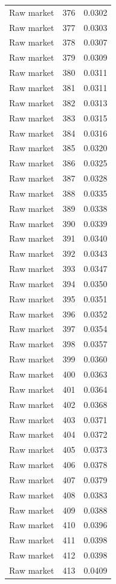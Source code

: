 \begin{table}[htbp]
\begin{tabular}{lll}
Raw market & 376 & 0.0302 \\
Raw market & 377 & 0.0303 \\
Raw market & 378 & 0.0307 \\
Raw market & 379 & 0.0309 \\
Raw market & 380 & 0.0311 \\
Raw market & 381 & 0.0311 \\
Raw market & 382 & 0.0313 \\
Raw market & 383 & 0.0315 \\
Raw market & 384 & 0.0316 \\
Raw market & 385 & 0.0320 \\
Raw market & 386 & 0.0325 \\
Raw market & 387 & 0.0328 \\
Raw market & 388 & 0.0335 \\
Raw market & 389 & 0.0338 \\
Raw market & 390 & 0.0339 \\
Raw market & 391 & 0.0340 \\
Raw market & 392 & 0.0343 \\
Raw market & 393 & 0.0347 \\
Raw market & 394 & 0.0350 \\
Raw market & 395 & 0.0351 \\
Raw market & 396 & 0.0352 \\
Raw market & 397 & 0.0354 \\
Raw market & 398 & 0.0357 \\
Raw market & 399 & 0.0360 \\
Raw market & 400 & 0.0363 \\
Raw market & 401 & 0.0364 \\
Raw market & 402 & 0.0368 \\
Raw market & 403 & 0.0371 \\
Raw market & 404 & 0.0372 \\
Raw market & 405 & 0.0373 \\
Raw market & 406 & 0.0378 \\
Raw market & 407 & 0.0379 \\
Raw market & 408 & 0.0383 \\
Raw market & 409 & 0.0388 \\
Raw market & 410 & 0.0396 \\
Raw market & 411 & 0.0398 \\
Raw market & 412 & 0.0398 \\
Raw market & 413 & 0.0409 \\

\end{tabular}
\end{table}
